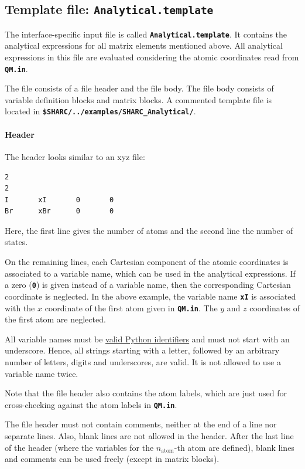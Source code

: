 \documentclass[a4paper,10pt,DIV=15,openany]{scrbook}
\newcommand{\link}[2]{\href{#1}{#2}}
\newcommand{\ttt}[1]{\textbf{\texttt{#1}}}
\newenvironment{example}{
  \setlength{\OuterFrameSep}{3pt}
  \vspace{0mm}
  \definecolor{shadecolor}{HTML}{E4F4FF}
  \begin{shaded}
}{
  \end{shaded}
}
\begin{document}
\subsection{Template file: \ttt{Analytical.template}}

The interface-specific input file is called \ttt{Analytical.template}. It contains the analytical expressions for all matrix elements mentioned above. All analytical expressions in this file are evaluated considering the atomic coordinates read from \ttt{QM.in}.

The file consists of a file header and the file body. The file body consists of variable definition blocks and matrix blocks.
A commented template file is located in \ttt{\$SHARC/../examples/SHARC\_Analytical/}.

\paragraph{Header} 

The header looks similar to an xyz file:
\begin{example}
  \begin{verbatim}
2
2
I       xI       0       0
Br      xBr      0       0
\end{verbatim}
\end{example}
Here, the first line gives the number of atoms and the second line the number of states. 

On the remaining lines, each Cartesian component of the atomic coordinates is associated to a variable name, which can be used in the analytical expressions. If a zero (\ttt{0}) is given instead of a variable name, then the corresponding Cartesian coordinate is neglected. In the above example, the variable name \ttt{xI} is associated with the $x$ coordinate of the first atom given in \ttt{QM.in}. The $y$ and $z$ coordinates of the first atom are neglected.

All variable names must be \link{https://docs.python.org/2/reference/lexical_analysis.html\#identifiers}{valid Python identifiers} and must not start with an underscore. Hence, all strings starting with a letter, followed by an arbitrary number of letters, digits and underscores, are valid. It is not allowed to use a variable name twice.

Note that the file header also contains the atom labels, which are just used for cross-checking against the atom labels in \ttt{QM.in}.

The file header must not contain comments, neither at the end of a line nor separate lines. Also, blank lines are not allowed in the header. After the last line of the header (where the variables for the $n_{\text{atom}}$-th atom are defined), blank lines and comments can be used freely (except in matrix blocks).
\end{document}
